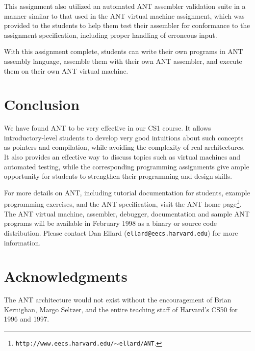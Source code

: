 This assignment also utilized an automated ANT assembler validation
suite
in a manner similar to that used
in the ANT virtual machine assignment,
which was provided to the students to help them test their
assembler for conformance to the assignment specification, including
proper handling of erroneous input.

With this assignment complete, students can write their own programs
in ANT assembly language, assemble them with their own ANT assembler,
and execute them on their own ANT virtual machine.

\section{Conclusion}

We have found ANT to be very effective in our CS1 course.  It allows
introductory-level students to develop very good intuitions about such
concepts as pointers and compilation, while avoiding the complexity of
real architectures.   It also provides an effective way to discuss
topics such as virtual machines and automated testing, while the
corresponding programming assignments give ample opportunity for students
to strengthen their programming and design skills. 



For more details on ANT, including tutorial documentation
for students, example programming exercises, and the ANT specification,
visit the ANT home page\footnote{
{\tt http://www.eecs.harvard.edu/$\sim$ellard/ANT}.}.
The ANT virtual machine, assembler,
debugger, documentation and sample ANT programs will be available
in February 1998 as a binary or source code distribution.
Please contact Dan Ellard ({\tt ellard\verb$@$eecs.harvard.edu}) for
more information.

\section{Acknowledgments}

The ANT architecture would not exist without the encouragement of
Brian Kernighan, Margo Seltzer, and the entire teaching staff of
Harvard's CS50 for 1996 and 1997.



